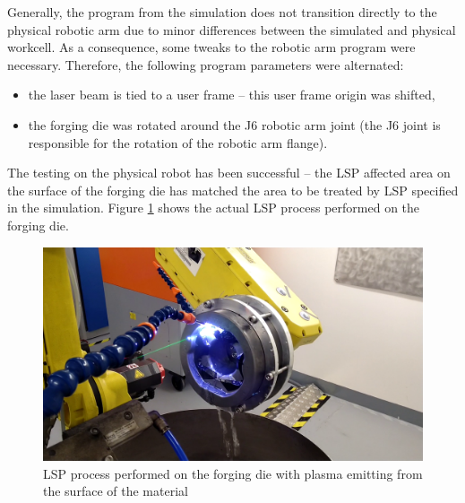 Generally, the program from the simulation does not transition directly to the physical robotic arm due to minor differences between the simulated and physical workcell.  As a consequence, some tweaks to the robotic arm program were necessary. Therefore, the following program parameters were alternated:

\begin{itemize}

\item the laser beam is tied to a user frame -- this user frame origin was shifted,

\item the forging die was rotated around the J6 robotic arm joint (the J6 joint is responsible for the rotation of the robotic arm flange).
 
\end{itemize}

The testing on the physical robot has been successful -- the LSP affected area on the surface of the forging die has matched the area to be treated by LSP specified in the simulation. Figure \ref{fig:peening} shows the actual LSP process performed on the forging die. 

\begin{figure}[h]
    \centering
    \includegraphics[width=0.9\linewidth]{img/peening_v2.png}
    \caption{LSP process performed on the forging die with plasma emitting from the surface of the material}
    \label{fig:peening}
\end{figure}



